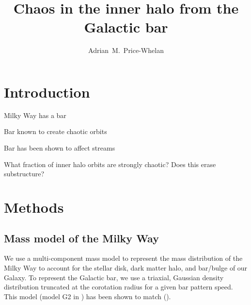 \documentclass[modern]{aastex61}
\begin{document}
\sloppy\sloppypar\raggedbottom\frenchspacing %

\title{Chaos in the inner halo from the Galactic bar}

\author[0000-0003-0872-7098]{Adrian~M.~Price-Whelan}



\begin{abstract}
\end{abstract}


\section{Introduction} \label{sec:intro}

Milky Way has a bar

Bar known to create chaotic orbits

Bar has been shown to affect streams

What fraction of inner halo orbits are strongly chaotic?
Does this erase substructure?

\section{Methods} \label{sec:methods}

\subsection{Mass model of the Milky Way} \label{sec:potential}

We use a multi-component mass model to represent the mass distribution of the
Milky Way to account for the stellar disk, dark matter halo, and bar/bulge of
our Galaxy.
To represent the Galactic bar, we use a triaxial, Gaussian density
distribution truncated at the corotation radius for a given bar pattern speed.
This model (model G2 in \citealt{Dwek:1995}) has been shown to match
 (\citealt{Dwek:1995,Wang:2012}).
\end{document}
